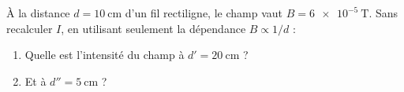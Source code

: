 \documentclass[11pt,a4paper]{article}
\begin{document}
\begin{exo}[la décroissance en $1/d$]
À la distance $d=\qty{10}{\centi\metre}$ d'un fil rectiligne, le champ vaut $B=\qty{6e-5}{\tesla}$.
Sans recalculer $I$, en utilisant seulement la dépendance $B\propto 1/d$ :
\begin{enumerate}[label=\alph*)]
  \item Quelle est l'intensité du champ à $d'=\qty{20}{\centi\metre}$ ?
  \item Et à $d''=\qty{5}{\centi\metre}$ ?
\end{enumerate}
\end{exo}
\end{document}
